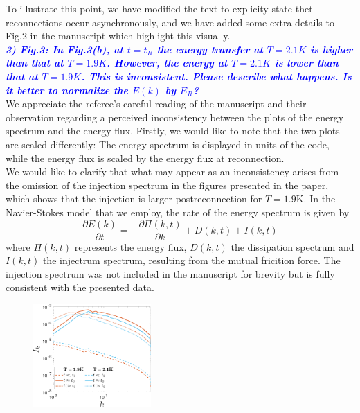 \documentclass[a4paper,10pt]{article}
\def\blue#1{\textcolor{blue}{#1}}
\def\refcomment#1{\textbf{\blue{\emph{#1}}}\\}
\begin{document}
    To illustrate this point, we have modified the text to explicity state thet reconnections occur asynchronously, and we have added some extra details to Fig.2 in the manuscript which highlight this visually. \\

    \refcomment{3) Fig.3: In Fig.3(b), at $t = t_R$ the energy transfer at $T = 2.1K$ is
    higher than that at $T = 1.9K$. However, the energy at $T = 2.1K$ is lower
    than that at $T = 1.9K$. This is inconsistent. Please describe what
    happens. Is it better to normalize the $E(k)$ by $E_R$?}

    We appreciate the referee’s careful reading of the manuscript and their observation regarding a perceived inconsistency between the plots of the energy spectrum and the energy flux. Firstly, we would like to note that the two plots are scaled differently: The energy spectrum is displayed in units of the code, while the energy flux is scaled by the energy flux at reconnection.\\

    We would like to clarify that what may appear as an inconsistency arises from the omission of the injection spectrum in the figures presented in the paper, which shows that the injection is larger postreconnection for $T=1.9$K. In the Navier-Stokes model that we employ, the rate of the energy spectrum is given by
    \begin{equation}
        \frac{\partial E(k)}{\partial t} = -\frac{\partial \Pi(k,t)}{\partial k} + D(k,t) + I(k,t)
    \end{equation}
    where $\Pi(k,t)$ represents the energy flux, $D(k,t)$ the dissipation spectrum and $I(k,t)$ the injectrum spectrum, resulting from the mutual fricition force. The injection spectrum was not included in the manuscript for brevity but is fully consistent with the presented data.

    \begin{figure}[H]
        \centering
        \includegraphics[width=0.4\textwidth]{inj-spec.pdf}
    \end{figure}
\end{document}
